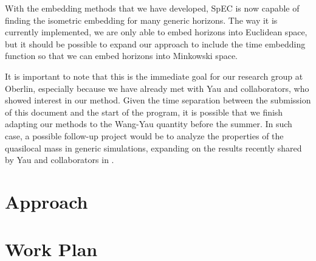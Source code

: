 \documentclass{../letter}
\begin{document}
	With the embedding methods that we have developed, SpEC is now capable of finding the isometric embedding for many generic horizons. The way it is currently implemented, we are only able to embed horizons into Euclidean space, but it should be possible to expand our approach to include the time embedding function so that we can embed horizons into Minkowski space.

	It is important to note that this is the immediate goal for our research group at Oberlin, especially because we have already met with Yau and collaborators, who showed interest in our method. Given the time separation between the submission of this document and the start of the program, it is possible that we finish adapting our methods to the Wang-Yau quantity before the summer. In such case, a possible follow-up project would be to analyze the properties of the quasilocal mass in generic simulations, expanding on the results recently shared by Yau and collaborators in \cite{Yau_2023}.

	\section{Approach}

	\section{Work Plan}

	
	
\end{document}
